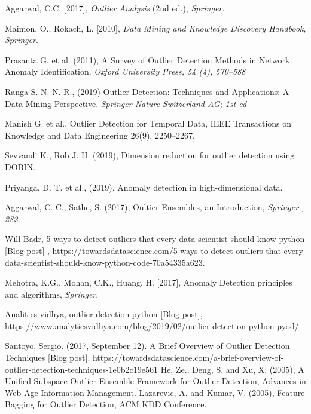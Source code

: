 \newpage {}
\begin{thebibliography}{99}

 Aggarwal, C.C. [2017],  \textit{Outlier Analysis} (2nd ed.), {\it Springer.} 

 Maimon, O.,  Rokach, L. [2010], \textit{Data Mining and Knowledge Discovery Handbook}, {\it Springer}. 

 Prasanta G. et al. (2011), A Survey of Outlier Detection Methods in Network Anomaly Identification. {\it Oxford University Press, 54 (4), 570--588 }

 Ranga S. N. N. R., (2019) Outlier Detection: Techniques and Applications: A Data Mining Perspective. {\it Springer Nature Switzerland AG; 1st ed}

 Manish G. et al., Outlier Detection for Temporal Data, IEEE Transactions on Knowledge and Data Engineering 26(9), 2250–2267.

 Sevvandi K., Rob J. H. (2019), Dimension reduction for outlier detection using DOBIN.

 Priyanga, D. T. et al., (2019),  Anomaly detection in high-dimensional data.

 Aggarwal, C. C., Sathe, S. (2017), Oultier Ensembles, an Introduction, {\it Springer , 282.}

 Will Badr,  5-ways-to-detect-outliers-that-every-data-scientist-should-know-python [Blog post] , https://towardsdatascience.com/5-ways-to-detect-outliers-that-every-data-scientist-should-know-python-code-70a54335a623. 

 Mehotra, K.G., Mohan, C.K., Huang, H. [2017],  Anomaly Detection principles and algorithms, {\it Springer}. 

  Analitics vidhya, outlier-detection-python [Blog post], https://www.analyticsvidhya.com/blog/2019/02/outlier-detection-python-pyod/

 Santoyo, Sergio. (2017, September 12). A Brief Overview of Outlier Detection Techniques [Blog post]. https://towardsdatascience.com/a-brief-overview-of-outlier-detection-techniques-1e0b2c19e561
 He, Ze., Deng, S. and Xu, X. (2005), A Unified Subspace Outlier Ensemble Framework for Outlier Detection, Advances in Web Age Information Management.
 Lazarevic, A.  and Kumar, V. (2005), Feature Bagging for Outlier Detection, ACM KDD Conference.


\end{thebibliography}
